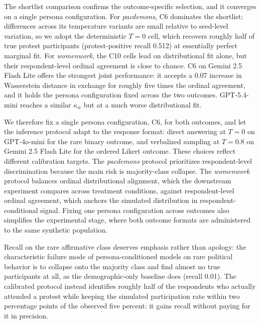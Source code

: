 The shortlist comparison confirms the outcome-specific selection, and it
converges on a single persona configuration. For \textit{pacdemons}, C6
dominates the shortlist; differences across its temperature variants are
small relative to seed-level variation, so we adopt the deterministic
$T=0$ cell, which recovers roughly half of true protest participants
(protest-positive recall 0.512) at essentially perfect marginal fit. For
\textit{womenwork}, the C10 cells lead on distributional fit alone, but
their respondent-level ordinal agreement is close to chance. C6 on
Gemini 2.5 Flash Lite offers the strongest joint performance: it accepts a
0.07 increase in Wasserstein distance in exchange for roughly five times
the ordinal agreement, and it holds the persona configuration fixed across
the two outcomes. GPT-5.4-mini reaches a similar $\kappa_w$ but at a much
worse distributional fit.

We therefore fix a single persona configuration, C6, for both outcomes,
and let the inference protocol adapt to the response format: direct
answering at $T=0$ on GPT-4o-mini for the rare binary outcome, and
verbalized sampling at $T=0.8$ on Gemini 2.5 Flash Lite for the ordered
Likert outcome. These choices reflect different calibration targets. The
\textit{pacdemons} protocol prioritizes respondent-level discrimination
because the main risk is majority-class collapse. The \textit{womenwork}
protocol balances ordinal distributional alignment, which the downstream
experiment compares across treatment conditions, against respondent-level
ordinal agreement, which anchors the simulated distribution in
respondent-conditional signal. Fixing one persona configuration across
outcomes also simplifies the experimental stage, where both outcome
formats are administered to the same synthetic population.

Recall on the rare affirmative class deserves emphasis rather than
apology: the characteristic failure mode of persona-conditioned models on
rare political behavior is to collapse onto the majority class and find
almost no true participants at all, as the demographic-only baseline does
(recall 0.01). The calibrated protocol instead identifies roughly half of
the respondents who actually attended a protest while keeping the
simulated participation rate within two percentage points of the observed
five percent: it gains recall without paying for it in precision.


